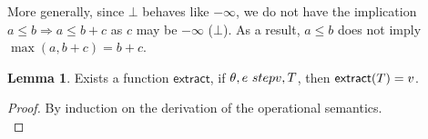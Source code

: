 \documentclass[a4paper,11pt]{article}
\newcommand{\wq}[1]{\textcolor[rgb]{.50,0.0,0.7}{ #1}}
\theoremstyle{definition}
\newtheorem{lem}[thm]{Lemma}
\begin{document}
More generally, since $\bot$ behaves like $-\infty$, we do not have
the implication $a \leq b \Rightarrow a \leq b + c$ as $c$ may be
$-\infty$ ($\bot$). As a result, $a \leq b$ does not imply $\max(a, b
+ c) = b + c$.

\begin{lem}\label{lem:trace_extract}
  Exists a function $\mathsf{extract}$, if $\theta, e \
  step v,
T  $, then $\mathsf{extract}(T) = v$.
\end{lem}
%
\begin{proof}
\wq{ By induction on the derivation of the operational semantics.}\\
%




\end{proof}
\end{document}
